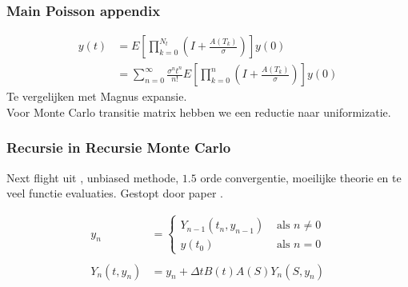 \documentclass[18pt,aspectratio=149]{beamer}
\begin{document}
\begin{frame}
    \frametitle{Main Poisson appendix}
    \begin{align}
        y(t) & = E \left[\prod_{k=0}^{N_{t}}\left( I + \frac{A(T_{k})}{\sigma} \right)    \right] y(0)                                             \\
             & = \sum_{n=0}^{\infty}\frac{\sigma^{n} t ^{n}}{n!} E \left[\prod_{k=0}^{n}\left( I + \frac{A(T_{k})}{\sigma} \right)    \right] y(0)
    \end{align}
    Te vergelijken met Magnus expansie.\\
    Voor Monte Carlo transitie matrix hebben we een reductie naar uniformizatie.

\end{frame}

\begin{frame}
    \frametitle{Recursie in Recursie Monte Carlo}
    Next flight uit \cite{sawhney_grid-free_2022}, unbiased methode, $1.5$ orde convergentie,
    moeilijke theorie en te veel functie evaluaties. Gestopt door paper \cite{daun_randomized_2011}.
    \begin{center}
    \end{center}
    \vspace{-0.5cm}
    \begin{align}
        y_{n}          & = \begin{cases}
                               Y_{n-1}(t_{n},y_{n-1}) & \text{ als } n \neq 0        \\
                               y(t_{0})               & \text{ als } n = 0 \nonumber
                           \end{cases} \\
        \\
        Y_{n}(t,y_{n}) & = y_{n} + \Delta t B(t) A(S ) Y_{n}(S,y_{n})
    \end{align}
\end{frame}
\end{document}
